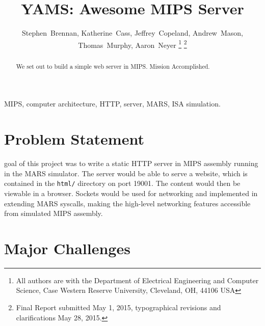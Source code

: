 \documentclass[journal,10pt]{IEEEtran}
\begin{document}
\title{YAMS: Awesome MIPS Server}

\author{
Stephen~Brennan,
Katherine~Cass,
Jeffrey~Copeland,
Andrew~Mason,
Thomas~Murphy,
Aaron~Neyer%
\thanks{All authors are with the Department of Electrical Engineering and Computer Science, Case Western Reserve University, Cleveland, OH, 44106 USA}%
\thanks{Final Report submitted May 1, 2015, typographical revisions and clarifications May 28, 2015.}
} %


%
{}

\maketitle

\begin{abstract}
We set out to build a simple web server in MIPS. Mission Accomplished.
\end{abstract}

\begin{IEEEkeywords}
MIPS, computer architecture, HTTP, server, MARS, ISA simulation.
\end{IEEEkeywords}


\section{Problem Statement}

 goal of this project was to write a static HTTP server in
MIPS assembly running in the MARS simulator. The server would be able to serve a
website, which is contained in the \texttt{html/} directory on port 19001. The
content would then be viewable in a browser. Sockets would be used for
networking and implemented in extending MARS syscalls, making the high-level
networking features accessible from simulated MIPS assembly.


\section{Major Challenges}
\end{document}
